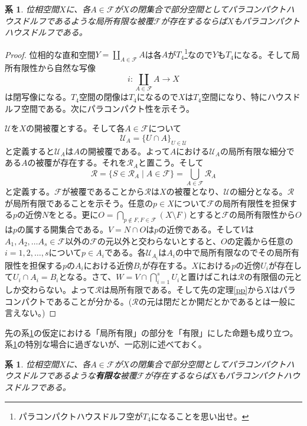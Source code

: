 \documentclass[leqno]{jsarticle}
\newtheorem{cor}[thm]{系}
\newcommand{\dpst}{\displaystyle}
\begin{document}
\begin{cor}\label{pa}
位相空間$X$に、各$A\in \mathcal{F}$が$X$の閉集合で部分空間としてパラコンパクトハウスドルフであるような局所有限な被覆$\mathcal{F}$が存在するならば$X$もパラコンパクトハウスドルフである。
\end{cor}
\begin{proof}
位相的な直和空間$Y=\dpst\coprod_{A\in \mathcal{F}}A$は各$A$が$T_4$\footnote{パラコンパクトハウスドルフ空が$T_4$になることを思い出せ。}なので$Y$も$T_4$になる。そして局所有限性から自然な写像
\[
i:\coprod_{A\in \mathcal{F}}A\to X
\]
は閉写像になる。$T_4$空間の閉像は$T_4$になるので$X$は$T_4$空間になり、特にハウスドルフ空間である。次にパラコンパクト性を示そう。\par
$\mathcal{U}$を$X$の開被覆とする。そして各$A\in \mathcal{F}$について
\[
\mathcal{U}_A=\{U\cap A\}_{U\in \mathcal{U}}
\]
と定義すると$\mathcal{U}_A$は$A$の開被覆である。よって$A$における$\mathcal{U}_A$の局所有限な細分である$A$の被覆が存在する。それを$\mathcal{R}_A$と置こう。そして
\[
\mathcal{R}=\{S\in \mathcal{R}_A\mid A\in \mathcal{F}\}=\bigcup_{A\in \mathcal{F}}\mathcal{R}_A
\]
と定義する。$\mathcal{F}$が被覆であることから$\mathcal{R}$は$X$の被覆となり、$\mathcal{U}$の細分となる。$\mathcal{R}$が局所有限であることを示そう。任意の$p\in X$について$\mathcal{F}$の局所有限性を担保する$p$の近傍$N$をとる。更に$\dpst O=\bigcap_{p\notin F,F\in \mathcal{F}}(X\setminus F)$とすると$\mathcal{F}$の局所有限性から$O$は$p$の属する開集合である。$V=N\cap O$は$p$の近傍である。そして$V$は$A_1,A_2,\dots A_s\in \mathcal{F}$以外の$\mathcal{F}$の元以外と交わらないとすると、$O$の定義から任意の$i=1,2,\dots,s$について$p\in A_i$である。各$\mathcal{U}_{A_i}$は$A_i$の中で局所有限なのでその局所有限性を担保する$p$の$A_i$における近傍$B_i$が存在する。$X$における$p$の近傍$U_i$が存在して$U_i\cap A_i=B_i$となる。さて、$\dpst W=V\cap \bigcap_{i=1}^sU_i$と置けばこれは$\mathcal{R}$の有限個の元としか交わらない。よって$\mathcal{R}$は局所有限である。そして先の定理\ref{pp}から$X$はパラコンパクトであることが分かる。($\mathcal{R}$の元は閉だとか開だとかであるとは一般に言えない。)
\end{proof}
先の系\ref{pa}の仮定における「局所有限」の部分を「有限」にした命題も成り立つ。系\ref{pa}の特別な場合に過ぎないが、一応別に述べておく。
\begin{cor}\label{pap}
位相空間$X$に、各$A\in \mathcal{F}$が$X$の閉集合で部分空間としてパラコンパクトハウスドルフであるような\textbf{有限な}被覆$\mathcal{F}$が存在するならば$X$もパラコンパクトハウスドルフである。
\end{cor}
\end{document}
